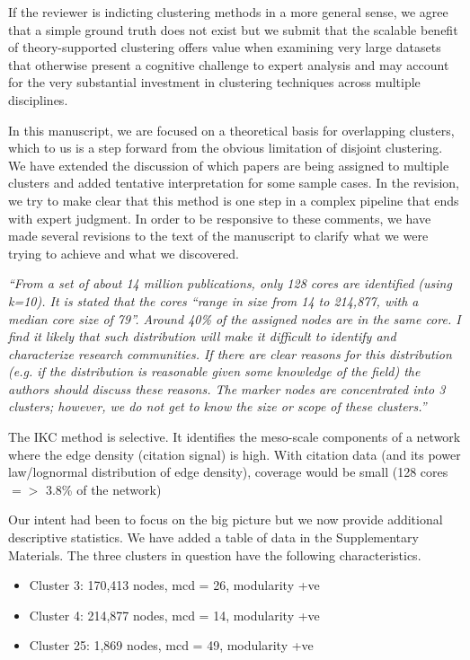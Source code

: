 \documentclass[11pt, oneside]{article}   	%
\begin{document}
If the reviewer is indicting clustering methods in a more general sense, we agree that a simple ground truth does not exist but we submit that the scalable benefit of theory-supported clustering offers
value when examining very large datasets that otherwise present a cognitive challenge to expert analysis and may account for the very substantial investment in clustering techniques across multiple disciplines. 

In this manuscript, we are focused on a theoretical basis for overlapping clusters, which to us is a step forward from the obvious limitation of disjoint clustering. We have extended the discussion of which papers are being assigned to multiple clusters and added tentative interpretation for some sample cases. In the revision, we try to make clear that this method is one step in a complex pipeline that ends with expert judgment. In order to be responsive to these comments, we have made several revisions to the text of the manuscript to clarify what we were trying to achieve and what we discovered.

\emph{``From a set of about 14 million publications, only 128 cores are identified (using k=10). It is stated that the cores “range in size from 14 to 214,877, with a median core size of 79”. Around 40\% of the assigned nodes are in the same core. I find it likely that such distribution will make it difficult to identify and characterize research communities. If there are clear reasons for this distribution (e.g. if the distribution is reasonable given some knowledge of the field) the authors should discuss these reasons. The marker nodes are concentrated into 3 clusters; however, we do not get to know the size or scope of these clusters.''}

The IKC method is selective. It identifies the meso-scale components of a network where the edge density (citation signal) is high. With citation data (and its power law/lognormal distribution of edge density), coverage would be small (128 cores $=>$ 3.8\% of the network) 

Our intent had been to focus on the big picture but we now provide additional descriptive statistics. We have added a table of data in the Supplementary Materials. The three clusters in question have the following characteristics. 

\clearpage

\begin{itemize}
\item Cluster 3: 170,413 nodes, mcd = 26, modularity +ve
\item Cluster 4: 214,877 nodes, mcd = 14, modularity +ve
\item Cluster 25: 1,869 nodes, mcd = 49, modularity +ve
\end{itemize}
\end{document}
